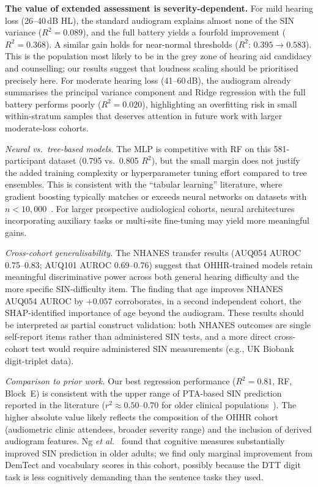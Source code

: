 \documentclass[conference]{IEEEtran}
\begin{document}
\textbf{The value of extended assessment is severity-dependent.}  For mild
hearing loss (26--40\,dB HL), the standard audiogram explains almost none of
the SIN variance ($R^2=0.089$), and the full battery yields a fourfold
improvement ($R^2=0.368$).  A similar gain holds for near-normal thresholds
($R^2$: $0.395 \to 0.583$).  This is the population most likely to be in the
grey zone of hearing aid candidacy and counselling; our results suggest that
loudness scaling should be prioritised precisely here.  For moderate hearing
loss (41--60\,dB), the audiogram already summarises the principal variance
component and Ridge regression with the full battery performs poorly
($R^2=0.020$), highlighting an overfitting risk in small within-stratum
samples that deserves attention in future work with larger moderate-loss
cohorts.

\textit{Neural vs.\ tree-based models.}  The MLP is competitive with RF on
this 581-participant dataset (0.795 vs.\ 0.805 $R^2$), but the small margin
does not justify the added
training complexity or hyperparameter tuning effort compared to tree
ensembles.  This is consistent with the ``tabular learning'' literature,
where gradient boosting typically matches or exceeds neural networks on
datasets with $n < 10{,}000$~\cite{Gorishniy2021Revisiting}.  For larger
prospective audiological cohorts, neural architectures incorporating
auxiliary tasks or multi-site fine-tuning may yield more meaningful gains.

\textit{Cross-cohort generalisability.}  The NHANES transfer results (AUQ054 AUROC 0.75--0.83; AUQ101 AUROC
0.69--0.76) suggest that OHHR-trained models retain meaningful discriminative
power across both general hearing difficulty and the more specific SIN-difficulty
item.  The finding that age improves NHANES AUQ054 AUROC by $+0.057$
corroborates, in a second independent cohort, the SHAP-identified importance of
age beyond the audiogram.  These results should be interpreted as partial
construct validation: both NHANES outcomes are single self-report items rather
than administered SIN tests, and a more direct cross-cohort test would require
administered SIN measurements (e.g., UK Biobank digit-triplet data).

\textit{Comparison to prior work.}  Our best regression performance
($R^2 = 0.81$, RF, Block~E) is consistent with the upper range of
PTA-based SIN prediction reported in the literature
($r^2 \approx 0.50$--$0.70$ for older clinical populations~\cite{Smoorenburg1992}).
The higher absolute value likely reflects the composition of the OHHR cohort
(audiometric clinic attendees, broader severity range) and the inclusion
of derived audiogram features.  Ng \textit{et al.}~\cite{Ng2015CognitionSIN}
found that cognitive measures substantially improved SIN prediction in
older adults; we find only marginal improvement from DemTect and vocabulary
scores in this cohort, possibly because the DTT digit task is less
cognitively demanding than the sentence tasks they used.
\end{document}
